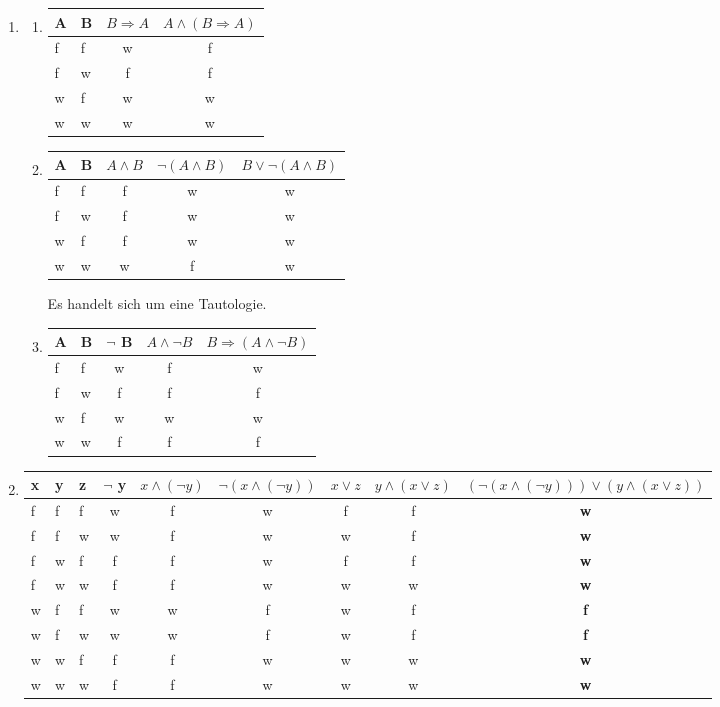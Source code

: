 \documentclass[a4paper]{article}
\begin{document}
\begin{enumerate}
		\item
		\begin{enumerate}
			\item
			\begin{tabular}{|l|l|c|c|}
				 \firsthline
				 A & B & $B  \Rightarrow A$ & $A \land (B  \Rightarrow A)$ \\
				 \hline
				 f & f & w & f \\
				 f & w & f & f \\
				 w & f & w & w \\
				 w & w & w & w \\
				 \hline
			\end{tabular}
			
			\item
			\begin{tabular}{|l|l|c|c|c|}
				\firsthline
				A & B & $A \land B$ & $\lnot (A \land B)$ & $B \lor \lnot (A \land B)$ \\
				\hline
				f & f & f & w & w \\
				f & w & f & w & w \\
				w & f & f & w & w \\
				w & w & w & f & w \\
				\hline
			\end{tabular}
			\newline
			Es handelt sich um eine Tautologie.
			
			\item
			\begin{tabular}{|l|l|c|c|c|}
				\firsthline
				A & B & $\lnot$ B & $A \land \lnot B$ & $B \Rightarrow (A \land \lnot B)$ \\
				\hline
				f & f & w & f & w \\
				f & w & f & f & f \\
				w & f & w & w & w \\
				w & w & f & f & f \\
				\hline
			\end{tabular}
		\end{enumerate}
		
		\item
		\begin{tabular}{|l|l|l|c|c|c|c|c|c|}
			\firsthline
			x & y & z & $\lnot$ y & $x \land (\lnot y)$ & $\lnot (x \land (\lnot y))$ & $x \lor z$ & $y \land (x \lor z)$ & $(\lnot (x \land (\lnot y))) \lor (y \land (x \lor z))$ \\
			\hline
			f & f & f & w & f & w & f & f & \textbf{w} \\
			f & f & w & w & f & w & w & f & \textbf{w} \\
			f & w & f & f & f & w & f & f & \textbf{w} \\
			f & w & w & f & f & w & w & w & \textbf{w} \\
			w & f & f & w & w & f & w & f & \textbf{f} \\
			w & f & w & w & w & f & w & f & \textbf{f} \\
			w & w & f & f & f & w & w & w & \textbf{w} \\
			w & w & w & f & f & w & w & w & \textbf{w} \\
			\hline
		\end{tabular}
		

\end{enumerate}
\end{document}
